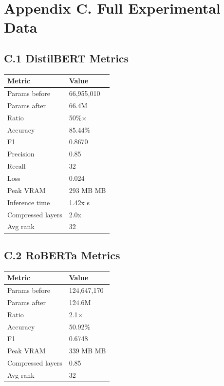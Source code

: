 
\section{Appendix C. Full Experimental Data}

\subsection{C.1 DistilBERT Metrics}

\begin{table}[H]
\centering
\small
\begin{tabular}{ll}
\toprule
\textbf{Metric} & \textbf{Value} \\
\midrule
Params before & 66,955,010 \\
Params after & 66.4M \\
Ratio & 50\%$\times$ \\
Accuracy & 85.44\% \\
F1 & 0.8670 \\
Precision & 0.85 \\
Recall & 32 \\
Loss & 0.024 \\
Peak VRAM & 293 MB MB \\
Inference time & 1.42x s \\
Compressed layers & 2.0x \\
Avg rank & 32 \\
\bottomrule
\end{tabular}
\end{table}

\subsection{C.2 RoBERTa Metrics}

\begin{table}[H]
\centering
\small
\begin{tabular}{ll}
\toprule
\textbf{Metric} & \textbf{Value} \\
\midrule
Params before & 124,647,170 \\
Params after & 124.6M \\
Ratio & 2.1$\times$ \\
Accuracy & 50.92\% \\
F1 & 0.6748 \\
Peak VRAM & 339 MB MB \\
Compressed layers & 0.85 \\
Avg rank & 32 \\
\bottomrule
\end{tabular}
\end{table}

